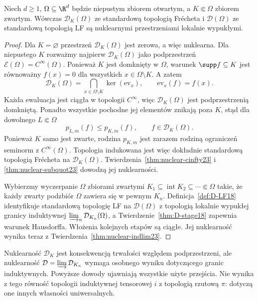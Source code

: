 \begin{twierdzenie}
\label{thm:nuclear-D23}
Niech $d\ge1$, $\Omega\subseteq\R^d$ będzie niepustym
zbiorem otwartym, a $K\Subset\Omega$ zbiorem zwartym.
Wówczas $\mathcal D_K(\Omega)$ ze standardową topologią
Frécheta i $\mathcal D(\Omega)$ ze standardową topologią
LF są nuklearnymi przestrzeniami lokalnie wypukłymi.
\end{twierdzenie}
\begin{proof}
Dla $K=\varnothing$ przestrzeń $\mathcal D_K(\Omega)$
jest zerowa, a więc nuklearna. Dla niepustego $K$
rozważmy najpierw $\mathcal D_K(\Omega)$ jako
podprzestrzeń $\mathcal E(\Omega)=C^\infty(\Omega)$.
Ponieważ $K$ jest domknięty w $\Omega$,
warunek $\supp f\subseteq K$ jest równoważny
$f(x)=0$ dla wszystkich $x\in\Omega\setminus K$.
A zatem
\[
 \mathcal D_K(\Omega)=
 \bigcap_{x\in\Omega\setminus K}\ker(\mathrm{ev}_x),
 \qquad \mathrm{ev}_x(f)=f(x).
\]
Każda ewaluacja jest ciągła w topologii $C^\infty$,
więc $\mathcal D_K(\Omega)$ jest podprzestrzenią
domkniętą. Ponadto wszystkie pochodne jej elementów
znikają poza $K$, stąd dla dowolnego $L\Subset\Omega$
\[
 p_{L,m}(f)\le p_{K,m}(f),\qquad
 f\in\mathcal D_K(\Omega).
\]
Ponieważ $K$ samo jest zwarte, rodzina $p_{K,m}$
jest zarazem rodziną ograniczeń seminorm z $C^\infty(\Omega)$.
Topologia indukowana jest więc dokładnie standardową
topologią Frécheta na $\mathcal D_K(\Omega)$.
Twierdzenia~\ref{thm:nuclear-cinfty23} i
\ref{thm:nuclear-subquot23} dowodzą jej nuklearności.

Wybierzmy wyczerpanie $\Omega$ zbiorami zwartymi
$K_1\subseteq\operatorname{int}K_2\subseteq\cdots\Subset\Omega$
takie, że każdy zwarty podzbiór $\Omega$ zawiera się
w pewnym $K_n$. Definicja~\ref{def:D-LF18} identyfikuje standardową
topologię LF na $\mathcal D(\Omega)$ z topologią
lokalnie wypukłej granicy induktywnej
$\varinjlim_n\mathcal D_{K_n}(\Omega)$, a
Twierdzenie~\ref{thm:D-stage18} zapewnia warunek Hausdorffa.
Włożenia kolejnych etapów są ciągłe.
Jej nuklearność wynika teraz z
Twierdzenia~\ref{thm:nuclear-indlim23}.
\end{proof}

\begin{uwaga}
\label{rem:nuclear-D-summary23}
Nuklearność $\mathcal D_K$ jest konsekwencją trwałości
względem podprzestrzeni, ale nuklearność
$\mathcal D=\varinjlim\mathcal D_{K_n}$ wymaga osobnego
wyniku dotyczącego granic induktywnych. Powyższe dowody
ujawniają wszystkie użyte przejścia. Nie wynika z tego
równość topologii induktywnej tensorowej $i$ z topologią
rzutową $\pi$: dotyczą one innych własności uniwersalnych.
\end{uwaga}

